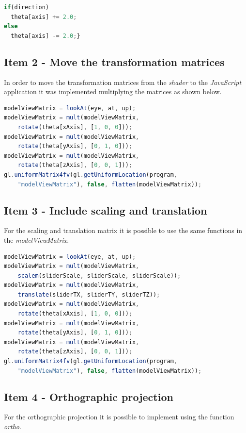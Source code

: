 \documentclass{article}
\begin{document}
\begin{lstlisting}[language=JavaScript]
if(direction)
  theta[axis] += 2.0;
else
  theta[axis] -= 2.0;}
\end{lstlisting}

\subsection {Item 2 - Move the transformation matrices}
In order to move the transformation matrices from the \textit{shader} to the \textit{JavaScript} application it was implemented multiplying the matrices as shown below.

\begin{lstlisting}[language=JavaScript]
modelViewMatrix = lookAt(eye, at, up);
modelViewMatrix = mult(modelViewMatrix,
    rotate(theta[xAxis], [1, 0, 0]));
modelViewMatrix = mult(modelViewMatrix,
    rotate(theta[yAxis], [0, 1, 0]));
modelViewMatrix = mult(modelViewMatrix,
    rotate(theta[zAxis], [0, 0, 1]));
gl.uniformMatrix4fv(gl.getUniformLocation(program,
    "modelViewMatrix"), false, flatten(modelViewMatrix));
\end{lstlisting}

\subsection {Item 3 - Include scaling and translation}
For the scaling and translation matrix it is possible to use the same functions in the \textit{modelViewMatrix}.

\begin{lstlisting}[language=JavaScript]
modelViewMatrix = lookAt(eye, at, up);
modelViewMatrix = mult(modelViewMatrix,
    scalem(sliderScale, sliderScale, sliderScale));
modelViewMatrix = mult(modelViewMatrix,
    translate(sliderTX, sliderTY, sliderTZ));
modelViewMatrix = mult(modelViewMatrix,
    rotate(theta[xAxis], [1, 0, 0]));
modelViewMatrix = mult(modelViewMatrix,
    rotate(theta[yAxis], [0, 1, 0]));
modelViewMatrix = mult(modelViewMatrix,
    rotate(theta[zAxis], [0, 0, 1]));
gl.uniformMatrix4fv(gl.getUniformLocation(program,
    "modelViewMatrix"), false, flatten(modelViewMatrix));
\end{lstlisting}

\subsection {Item 4 - Orthographic projection}
For the orthographic projection it is possible to implement using the function \textit{ortho}.
\end{document}
